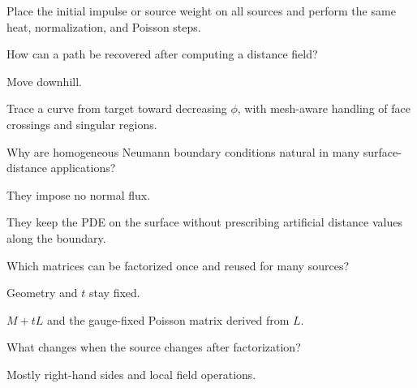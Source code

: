 \begin{solution}
Place the initial impulse or source weight on all sources and perform the same heat, normalization, and Poisson steps.
\end{solution}

\begin{exercise}\label{exr:vii40-19}
How can a path be recovered after computing a distance field?
\end{exercise}

\begin{hint}
Move downhill.
\end{hint}

\begin{solution}
Trace a curve from target toward decreasing \(\phi\), with mesh-aware handling of face crossings and singular regions.
\end{solution}

\begin{exercise}\label{exr:vii40-20}
Why are homogeneous Neumann boundary conditions natural in many surface-distance applications?
\end{exercise}

\begin{hint}
They impose no normal flux.
\end{hint}

\begin{solution}
They keep the PDE on the surface without prescribing artificial distance values along the boundary.
\end{solution}

\begin{exercise}\label{exr:vii40-21}
Which matrices can be factorized once and reused for many sources?
\end{exercise}

\begin{hint}
Geometry and \(t\) stay fixed.
\end{hint}

\begin{solution}
\(M+tL\) and the gauge-fixed Poisson matrix derived from \(L\).
\end{solution}

\begin{exercise}\label{exr:vii40-22}
What changes when the source changes after factorization?
\end{exercise}

\begin{hint}
Mostly right-hand sides and local field operations.
\end{hint}


